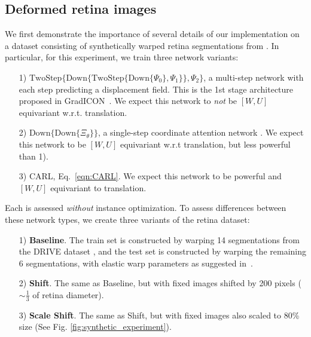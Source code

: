 \subsection{Deformed retina images}
\label{retinaexpr}
We first demonstrate the importance of several details of
our implementation on a dataset consisting of synthetically warped retina
segmentations from \cite{tian2022}. In particular, for this experiment,
we train three network variants:
\begin{itemize}
	\item[1)] $\text{TwoStep}\{\text{Down}\{\text{TwoStep}\{\text{Down}\{\Psi_0\},\Psi_1\}\}, \Psi_2 \}$, a multi-step network with each step predicting a displacement field. This is the 1st stage architecture proposed in GradICON~\cite{tian2022}. We expect this network to \emph{not} be $[W, U]$ equivariant w.r.t. translation.
	\item[2)] $\text{Down}\{\text{Down}\{\Xi_\theta\}\}$, a single-step coordinate attention network . We expect this network to be $[W, U]$ equivariant w.r.t translation, but less powerful than 1).
	\item[3)] CARL, Eq.~\eqref{eqn:CARL}. We expect this  network to be powerful and $[W, U]$ equivariant to translation.
\end{itemize}
Each is assessed \emph{without} instance optimization. To assess differences between these network types, we create three variants of the retina dataset:
\begin{itemize}
	\item[1)] {\bf Baseline}. The train
		set is constructed by warping 14 segmentations from the DRIVE dataset \cite{staal2004ridge}, and the
		test set is constructed by warping the remaining 6 segmentations, with elastic warp parameters as suggested in~\cite{tian2022}.
	\item[2)] {\bf Shift}. The same as Baseline, but with fixed images shifted by 200 pixels ($\sim \frac{1}{3}$ of retina diameter).
	\item[3)] {\bf Scale Shift}. The same as Shift, but with fixed images also scaled to 80\% size (See Fig. \ref{fig:synthetic_experiment}).
\end{itemize}

